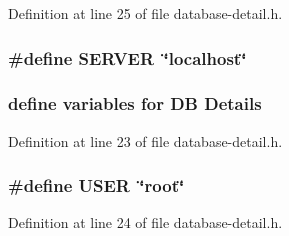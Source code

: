 Definition at line 25 of file database-\/detail.\-h.

\hypertarget{database-detail_8h_a24cd3c37a165a8c4626d9e78df4574ff}{
\subsubsection[{S\-E\-R\-V\-E\-R}]{\setlength{\rightskip}{0pt plus 5cm}\#define S\-E\-R\-V\-E\-R~\char`\"{}localhost\char`\"{}}}\label{database-detail_8h_a24cd3c37a165a8c4626d9e78df4574ff}


 \subsubsection*{define variables for D\-B Details}

Definition at line 23 of file database-\/detail.\-h.

\hypertarget{database-detail_8h_a8bfbbf31b7d3c07215440d18a064b7f4}{
\subsubsection[{U\-S\-E\-R}]{\setlength{\rightskip}{0pt plus 5cm}\#define U\-S\-E\-R~\char`\"{}root\char`\"{}}}\label{database-detail_8h_a8bfbbf31b7d3c07215440d18a064b7f4}


Definition at line 24 of file database-\/detail.\-h.

